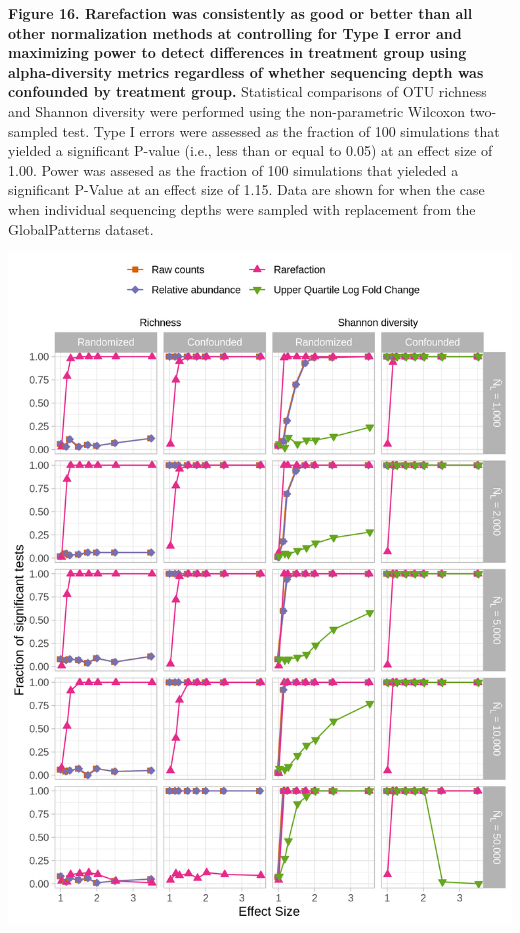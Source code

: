 \documentclass[
]{article}
\begin{document}
\textbf{Figure 16. Rarefaction was consistently as good or better than
all other normalization methods at controlling for Type I error and
maximizing power to detect differences in treatment group using
alpha-diversity metrics regardless of whether sequencing depth was
confounded by treatment group.} Statistical comparisons of OTU richness
and Shannon diversity were performed using the non-parametric Wilcoxon
two-sampled test. Type I errors were assessed as the fraction of 100
simulations that yielded a significant P-value (i.e., less than or equal
to 0.05) at an effect size of 1.00. Power was assesed as the fraction of
100 simulations that yieleded a significant P-Value at an effect size of
1.15. Data are shown for when the case when individual sequencing depths
were sampled with replacement from the GlobalPatterns dataset.

\newpage

\includegraphics{figure_17.png}
\end{document}
